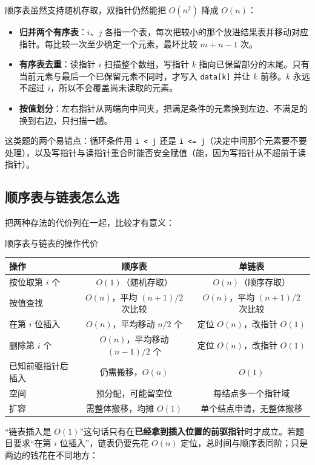 顺序表虽然支持随机存取，双指针仍然能把 $O(n^2)$ 降成 $O(n)$：

\begin{itemize}
\item \textbf{归并两个有序表}：$i$、$j$ 各指一个表，每次把较小的那个放进结果表并移动对应指针。每比较一次至少确定一个元素，最坏比较 $m+n-1$ 次。
\item \textbf{有序表去重}：读指针 $i$ 扫描整个数组，写指针 $k$ 指向已保留部分的末尾。只有当前元素与最后一个已保留元素不同时，才写入 \texttt{data[k]} 并让 $k$ 前移。$k$ 永远不超过 $i$，所以不会覆盖尚未读取的元素。
\item \textbf{按值划分}：左右指针从两端向中间夹，把满足条件的元素换到左边、不满足的换到右边，只扫描一趟。
\end{itemize}

这类题的两个易错点：循环条件用 \texttt{i < j} 还是 \texttt{i <= j}（决定中间那个元素要不要处理），以及写指针与读指针重合时能否安全赋值（能，因为写指针从不超前于读指针）。

\subsection{顺序表与链表怎么选}

把两种存法的代价列在一起，比较才有意义：

\begin{tablebox}{顺序表与链表的操作代价}
\centering
\begin{tabular}{lcc}
\toprule
操作 & 顺序表 & 单链表 \\
\midrule
按位取第 $i$ 个 & $O(1)$（随机存取） & $O(n)$（顺序存取） \\
按值查找 & $O(n)$，平均 $(n+1)/2$ 次比较 & $O(n)$，平均 $(n+1)/2$ 次比较 \\
在第 $i$ 位插入 & $O(n)$，平均移动 $n/2$ 个 & 定位 $O(n)$，改指针 $O(1)$ \\
删除第 $i$ 个 & $O(n)$，平均移动 $(n-1)/2$ 个 & 定位 $O(n)$，改指针 $O(1)$ \\
已知前驱指针后插入 & 仍需搬移，$O(n)$ & $O(1)$ \\
空间 & 预分配，可能留空位 & 每结点多一个指针域 \\
扩容 & 需整体搬移，均摊 $O(1)$ & 单个结点申请，无整体搬移 \\
\bottomrule
\end{tabular}
\end{tablebox}

“链表插入是 $O(1)$”这句话只有在\textbf{已经拿到插入位置的前驱指针}时才成立。若题目要求“在第 $i$ 位插入”，链表仍要先花 $O(n)$ 定位，总时间与顺序表同阶；只是两边的钱花在不同地方：

